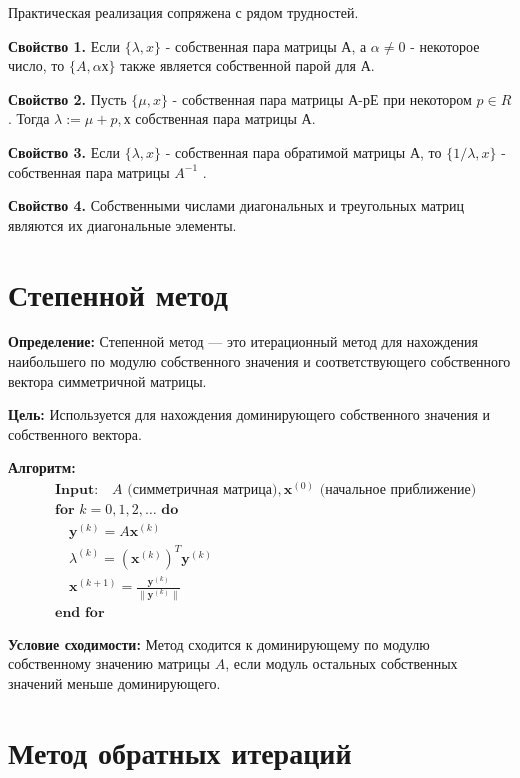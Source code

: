 \documentclass{article}
\begin{document}
Практическая реализация сопряжена с рядом трудностей.

\textbf{Свойство 1.} Если $\{\lambda,x\}$ - собственная пара матрицы А, а 
$\alpha\neq 0$ - некоторое число, то $\{A,\alpha х\}$ также является собственной 
парой для А. 

\textbf{Свойство 2.} Пусть $\{\mu, x\}$ - собственная пара матрицы 
А-рЕ при некотором $p\in R$. Тогда ${\lambda:=\mu + p,х}$ собственная пара 
матрицы А. 

\textbf{Свойство 3.} Если  $\{\lambda,x\}$ - собственная пара обратимой матрицы А, то $\{1/\lambda, x\}$ - собственная пара матрицы $A^{-1}$ . 

\textbf{Свойство 4.} Собственными числами диагональных и  
треугольных матриц являются их диагональные элементы. 

\section{Степенной метод}

\textbf{Определение:} Степенной метод — это итерационный метод для нахождения наибольшего по модулю собственного значения и соответствующего собственного вектора симметричной матрицы.

\textbf{Цель:} Используется для нахождения доминирующего собственного значения и собственного вектора.

\textbf{Алгоритм:}
\[
\begin{aligned}
&\textbf{Input:} \quad A \text{ (симметричная матрица)}, \mathbf{x}^{(0)} \text{ (начальное приближение)} \\
&\textbf{for } k = 0, 1, 2, \ldots \textbf{ do} \\
&\quad \mathbf{y}^{(k)} = A \mathbf{x}^{(k)} \\
&\quad \lambda^{(k)} = (\mathbf{x}^{(k)})^T \mathbf{y}^{(k)} \\
&\quad \mathbf{x}^{(k+1)} = \frac{\mathbf{y}^{(k)}}{\|\mathbf{y}^{(k)}\|} \\
&\textbf{end for}
\end{aligned}
\]

\textbf{Условие сходимости:} Метод сходится к доминирующему по модулю собственному значению матрицы \( A \), если модуль остальных собственных значений меньше доминирующего.

\section{Метод обратных итераций}
\end{document}
